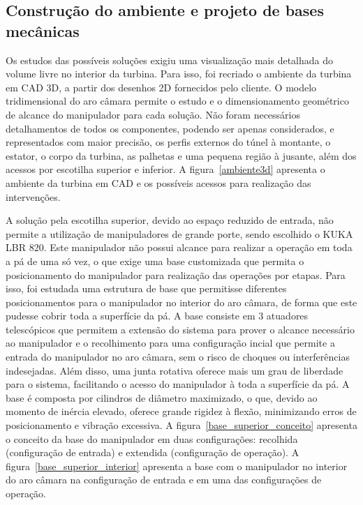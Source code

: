 \subsection{Construção do ambiente e projeto de bases
mecânicas}
Os estudos das possíveis soluções exigiu uma visualização mais detalhada do
volume livre no interior da turbina. Para isso, foi recriado o ambiente da
turbina em CAD 3D, a partir dos desenhos 2D fornecidos pelo cliente. O modelo
tridimensional do aro câmara permite o estudo e o dimensionamento geométrico de
alcance do manipulador para cada solução. Não foram necessários
detalhamentos de todos os componentes, podendo ser apenas considerados, e
representados com maior precisão, os perfis externos do túnel à montante, o
estator, o corpo da turbina, as palhetas e uma pequena região à jusante, além dos acessos por escotilha superior e inferior.
A figura~\ref{ambiente3d} apresenta o ambiente da turbina em CAD e os possíveis
acessos para realização das intervenções.

A solução pela escotilha superior, devido ao espaço reduzido de entrada, não
permite a utilização de manipuladores de grande porte, sendo escolhido o KUKA
LBR 820. Este manipulador não possui alcance para realizar a operação em toda a
pá de uma só vez, o que exige uma base customizada que permita o
posicionamento do manipulador para realização das operações por etapas. Para isso, foi estudada
uma estrutura de base que permitisse diferentes
posicionamentos para o manipulador no interior do aro câmara, de forma que este
pudesse cobrir toda a superfície da pá. A base consiste em 3 atuadores
telescópicos que permitem a extensão do sistema para prover o alcance
necessário ao manipulador e o recolhimento para uma configuração incial que
permite a entrada do manipulador no aro câmara, sem o risco de choques ou
interferências indesejadas. Além disso, uma junta rotativa oferece mais um grau
de liberdade para o sistema, facilitando o acesso do manipulador à toda a
superfície da pá. A base é composta por cilindros de diâmetro maximizado, o
que, devido ao momento de inércia elevado, oferece grande rigidez à flexão,
minimizando erros de posicionamento e vibração excessiva. A
figura~\ref{base_superior_conceito} apresenta o conceito da base do manipulador em duas configurações: recolhida (configuração de entrada) e extendida (configuração de operação).
A figura~\ref{base_superior_interior} apresenta a base com o manipulador no
interior do aro câmara na configuração de entrada e em uma das configurações de
operação.




